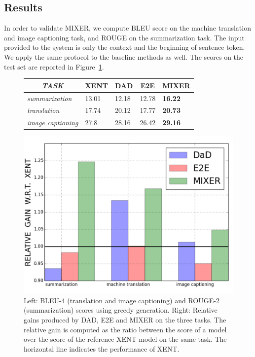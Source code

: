 \subsection{Results}
In order to validate MIXER, we compute BLEU score on the machine translation and image captioning task, and ROUGE on the summarization task. 
The input provided to the system is only the context and the beginning of sentence token. We apply the same protocol to the baseline methods as well. The scores on the test set are reported in Figure~\ref{fig:gain}. \begin{figure}[!t]
\centering
\begin{minipage}[c][][c]{.4\textwidth}
\centering
\begin{tabular}{l || l | l | l |l}
\multicolumn{1}{c||}{\emph{TASK} }  & 
      \multicolumn{1}{c|}{XENT} &
      \multicolumn{1}{c|}{DAD} & \multicolumn{1}{c|}{E2E} & \multicolumn{1}{c}{MIXER}\\
      \hline
      \hline
      {\em summarization} & 13.01 & 12.18 & 12.78 &  \bf{16.22} \\
      \hline
      {\em translation} & 17.74 & 20.12 & 17.77 & {\bf 20.73} \\
      \hline
      {\em image captioning} & 27.8 & 28.16 & 26.42 & \bf{29.16} \\
    \end{tabular}
\end{minipage}\hfill
\begin{minipage}[c][][c]{.4\textwidth}
\centering
\includegraphics[width=0.8\linewidth]{comparison2.pdf}
\vspace{-.30cm}
\caption{Left: BLEU-4 (translation and image captioning) and ROUGE-2 (summarization) scores using greedy generation. Right: Relative gains
  produced by DAD, E2E and MIXER on the three tasks. 
  The relative gain is computed as the ratio between the score of a model over the score of the reference XENT model on the same task. The horizontal line indicates the performance of XENT.}
\label{fig:gain}
\end{minipage}
\end{figure}
